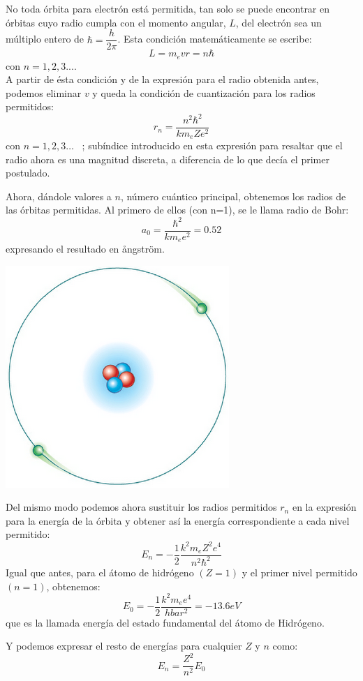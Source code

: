\documentclass[12pt,a4paper]{article}
\begin{document}
\begin{multicols}{2}
No toda órbita para electrón está permitida, tan solo se puede encontrar en órbitas cuyo radio cumpla con el momento angular, $L$, del electrón sea un múltiplo entero de $\hbar=\dfrac{h}{2\pi}$. Esta condición matemáticamente se escribe: $$L=m_{e}vr=n\hbar$$ con $n= 1,2,3...$.\\ A partir de ésta condición y de la expresión para el radio obtenida antes, podemos eliminar $v$ y queda la condición de cuantización para los radios permitidos:
$$r_{n}=\dfrac{n^{2}\hbar^{2}}{km_{e}Ze^{2}}$$ con $n= 1,2,3\ldots$  \ ; subíndice introducido     en esta expresión para resaltar que el radio ahora es una magnitud discreta, a diferencia de lo que decía el primer postulado.

Ahora, dándole valores a $n$, número cuántico principal, obtenemos los radios de las órbitas permitidas. Al primero de ellos (con n=1), se le llama radio de Bohr:
$$a_{0}=\dfrac{\hbar^{2}}{km_{e}e^{2}}=0.52$$
expresando el resultado en \aa ngstr\"om.\\

\begin{center}
\includegraphics[scale=.4]{MODELO_ATOMICO_DE_BOHR2pos.png}
\end{center}


Del mismo modo podemos ahora sustituir los radios permitidos $r_n$ en la expresión para la energía de la órbita y obtener así la energía correspondiente a cada nivel permitido:
$$E_n=-\dfrac{1}{2}\dfrac{k^2m_eZ^2e^4}{n^2\hbar^2}$$
Igual que antes, para el átomo de hidrógeno $(Z=1)$ y el primer nivel permitido $(n=1)$, obtenemos:
$$E_0=-\dfrac{1}{2}\dfrac{k^2m_{e}e^4}{hbar^2}=-13.6eV$$
que es la llamada energía del estado fundamental del átomo de Hidrógeno.

Y podemos expresar el resto de energías para cualquier $Z$ y $n$ como:
$$E_n=\dfrac{Z^2}{n^2}E_0$$

\end{multicols}
\end{document}
